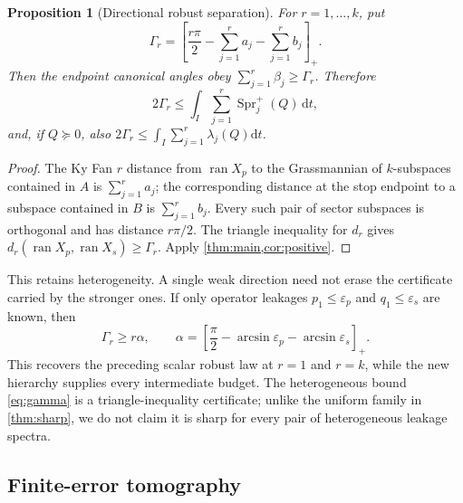 \documentclass[11pt]{article}
\newtheorem{proposition}[theorem]{Proposition}
\theoremstyle{definition}
\theoremstyle{remark}
\newcommand{\ran}{\operatorname{ran}}
\newcommand{\dd}{\mathrm d}
\newcommand{\Spr}{\operatorname{Spr}^{+}}
\newcommand{\pos}[1]{\left[#1\right]_{+}}
\begin{document}
\begin{proposition}[Directional robust separation]\label{prop:robust}
For $r=1,\ldots,k$, put
\begin{equation}\label{eq:gamma}
 \Gamma_r=\pos{\frac{r\pi}{2}-\sum_{j=1}^r a_j-\sum_{j=1}^r b_j}.
\end{equation}
Then the endpoint canonical angles obey
$\sum_{j=1}^r\beta_j\geq\Gamma_r$.  Therefore
\begin{equation}\label{eq:robusthierarchy}
 2\Gamma_r\leq\int_I\sum_{j=1}^r\Spr_j(Q)\,\dd t,
\end{equation}
and, if $Q\succeq0$, also
$2\Gamma_r\leq\int_I\sum_{j=1}^r\lambda_j(Q)\dd t$.
\end{proposition}

\begin{proof}
The Ky Fan $r$ distance from $\ran X_p$ to the Grassmannian of
$k$-subspaces contained in $A$ is $\sum_{j=1}^r a_j$; the corresponding
distance at the stop endpoint to a subspace contained in $B$ is
$\sum_{j=1}^r b_j$.  Every such pair of sector subspaces is orthogonal and
has distance $r\pi/2$.  The triangle inequality for $d_r$ gives
$d_r(\ran X_p,\ran X_s)\geq\Gamma_r$.  Apply \cref{thm:main,cor:positive}.
\end{proof}

This retains heterogeneity.  A single weak direction need not erase the
certificate carried by the stronger ones.  If only operator leakages
$p_1\leq\varepsilon_p$ and $q_1\leq\varepsilon_s$ are known, then
\begin{equation}\label{eq:uniform}
 \Gamma_r\geq r\alpha,\qquad
 \alpha=\pos{\frac\pi2-\arcsin\varepsilon_p-\arcsin\varepsilon_s}.
\end{equation}
This recovers the preceding scalar robust law at $r=1$ and $r=k$, while the
new hierarchy supplies every intermediate budget.  The heterogeneous bound
\eqref{eq:gamma} is a triangle-inequality certificate; unlike the uniform
family in \cref{thm:sharp}, we do not claim it is sharp for every pair of
heterogeneous leakage spectra.

\subsection{Finite-error tomography}
\end{document}
